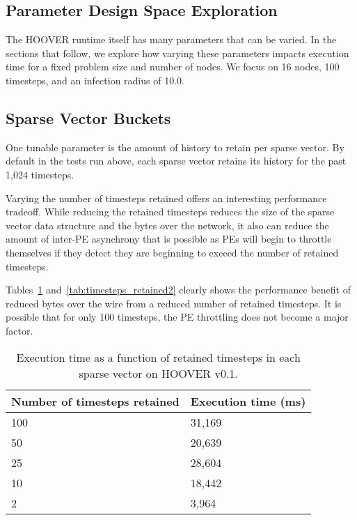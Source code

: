 \subsection{Parameter Design Space Exploration}

The HOOVER runtime itself has many parameters that can be varied. In the
sections that follow, we explore how varying these parameters impacts execution
time for a fixed problem size and number of nodes. We focus on 16 nodes, 100
timesteps, and an infection radius of 10.0.

\subsection{Sparse Vector Buckets}

One tunable parameter is the amount of history to retain per sparse vector. By
default in the tests run above, each sparse vector retains its history for the
past 1,024 timesteps.

Varying the number of timesteps retained offers an interesting performance
tradeoff. While reducing the retained timesteps reduces the size of the sparse
vector data structure and the bytes over the network, it also can reduce the amount
of inter-PE asynchrony that is possible as PEs will begin to throttle themselves
if they detect they are beginning to exceed the number of retained timesteps.

Tables~\ref{tab:timesteps_retained1} and~\ref{tab:timesteps_retained2} clearly shows the performance benefit of
reduced bytes over the wire from a reduced number of retained timesteps. It is
possible that for only 100 timesteps, the PE throttling does not become a major
factor.

\begin{table}
\centering
\begin{tabularx}{\textwidth}{ | X | X | }
\hline
Number of timesteps retained & Execution time (ms) \\\hline
100 & 31,169 \\\hline
50  & 20,639 \\\hline
25  & 28,604 \\\hline
10  & 18,442 \\\hline
2   & 3,964 \\\hline
\end{tabularx}
\caption{Execution time as a function of retained timesteps in each sparse vector on HOOVER v0.1.}
\label{tab:timesteps_retained1}
\end{table}

